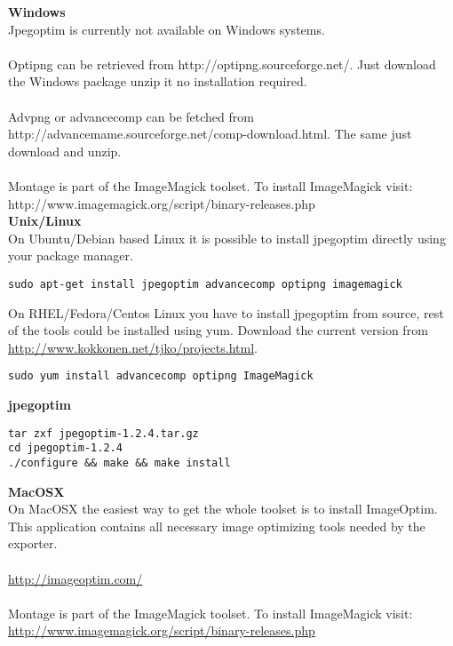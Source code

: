 \noindent \textbf{Windows}\\
\noindent Jpegoptim is currently not available on Windows systems.\\
\\
Optipng can be retrieved from http://optipng.sourceforge.net/. Just download the Windows package unzip it no installation required.\\
\\
Advpng or advancecomp can be fetched from http://advancemame.sourceforge.net/comp-download.html. The same just download and unzip.\\
\\
Montage is part of the ImageMagick toolset. To install ImageMagick visit:\\
http://www.imagemagick.org/script/binary-releases.php \\


\noindent \textbf{Unix/Linux}\\
\noindent On Ubuntu/Debian based Linux it is possible to install jpegoptim directly using your package manager.\\


\begin{verbatim}
sudo apt-get install jpegoptim advancecomp optipng imagemagick
\end{verbatim}

\noindent
On RHEL/Fedora/Centos Linux you have to install jpegoptim from source, rest of the tools could be installed using yum. Download the current version from \url{http://www.kokkonen.net/tjko/projects.html}. \\


\begin{verbatim}
sudo yum install advancecomp optipng ImageMagick
\end{verbatim}

\noindent \textbf{jpegoptim}
\begin{verbatim}
tar zxf jpegoptim-1.2.4.tar.gz
cd jpegoptim-1.2.4
./configure && make && make install
\end{verbatim}


\noindent \textbf{MacOSX}\\
\noindent On MacOSX the easiest way to get the whole toolset is to install ImageOptim. This application contains all necessary image optimizing tools needed by the exporter.\\
\\
\url{http://imageoptim.com/}\\
\\
Montage is part of the ImageMagick toolset. To install ImageMagick visit:\\
\url{http://www.imagemagick.org/script/binary-releases.php}\\

